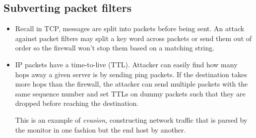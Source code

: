 \subsection{Subverting packet filters}
\begin{itemize}
    \item Recall in TCP, messages are split into packets before being sent. An attack against packet filters may split a key word across packets or send them out of order so the firewall won't stop them based on a matching string.
    
    \item IP packets have a time-to-live (TTL). Attacker can easily find how many hops away a given server is by sending ping packets. If the destination takes more hops than the firewall, the attacker can send multiple packets with the same sequence number and set TTLs on dummy packets such that they are dropped before reaching the destination.
    
    This is an example of \emph{evasion}, constructing network traffic that is parsed by the monitor in one fashion but the end host by another.
\end{itemize}

